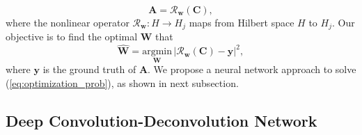 \documentclass{article}
\begin{document}
\begin{equation}
    \mathbf{A} = \mathcal{R}_{\mathbf{w}}(\mathbf{C}),
    \label{eq:generalized_form}
\end{equation}
where the nonlinear operator $\mathcal{R}_\mathbf{w}: H\rightarrow H_j$ maps from Hilbert space $H$ to $H_j$. Our objective is to find the optimal $\mathbf{W}$ that
\begin{equation}
	\widehat{\mathbf{W}} = \underset{\mathbf{W}}{\mathrm{argmin}}\,|\mathcal{R}_{\mathbf{w}}(\mathbf{C})-\mathbf{y}|^2,
	\label{eq:optimization_prob}
\end{equation}
where $\mathbf{y}$ is the ground truth of $\mathbf{A}$. We propose a neural network approach to solve (\ref{eq:optimization_prob}), as shown in next subsection.

\subsection{Deep Convolution-Deconvolution Network}
\label{sub:deep_conv-deconv_net}
\end{document}
